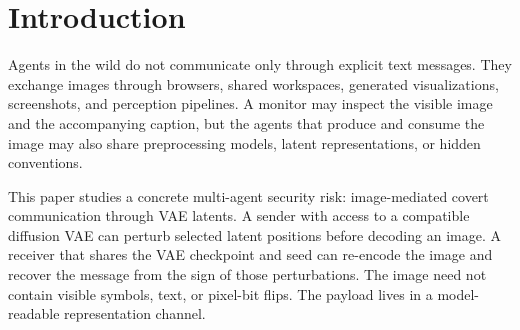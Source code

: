 \documentclass{article}
\begin{document}

\printAffiliationsAndNotice{}

\begin{abstract}
Multimodal agents increasingly coordinate through shared images: screenshots, generated plans, visual tool outputs, and workspace artifacts. We show that this communication substrate can support a covert channel that is invisible to ordinary pixel inspection but recoverable by another model-aware agent. PatchSteg is a training-free post-hoc channel in which a sender perturbs selected spatial positions in a diffusion VAE latent, decodes the result to an image, and a receiver re-encodes the image to recover the signed perturbations. Across 300 CIFAR-10 images and multiple Stable Diffusion VAE backbones, stability-selected carriers recover bits reliably while revealing a reliability--stealth tradeoff under detector sweeps. We frame PatchSteg as a multi-agent security finding: monitoring agent communication requires threat models and defenses that account for representation-level channels, not only visible content.
\end{abstract}

\section{Introduction}

Agents in the wild do not communicate only through explicit text messages. They exchange images through browsers, shared workspaces, generated visualizations, screenshots, and perception pipelines. A monitor may inspect the visible image and the accompanying caption, but the agents that produce and consume the image may also share preprocessing models, latent representations, or hidden conventions.

This paper studies a concrete multi-agent security risk: image-mediated covert communication through VAE latents. A sender with access to a compatible diffusion VAE can perturb selected latent positions before decoding an image. A receiver that shares the VAE checkpoint and seed can re-encode the image and recover the message from the sign of those perturbations. The image need not contain visible symbols, text, or pixel-bit flips. The payload lives in a model-readable representation channel.
\end{document}
